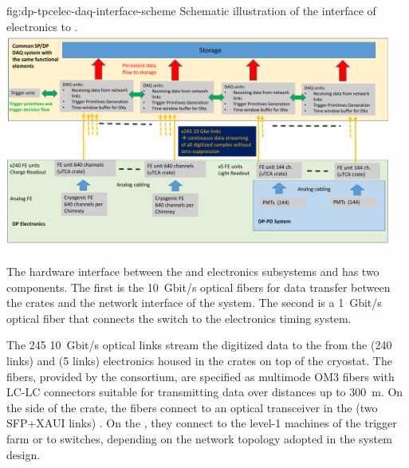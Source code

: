 \begin{dunefigure}{fig:dp-tpcelec-daq-interface-scheme}
{Schematic illustration of the interface of   electronics to .}
\includegraphics[width=0.95\textwidth]{graphics/dp-tpcelec-daq-interface-scheme}
\end{dunefigure}

The hardware interface between the   and  electronics subsystems and  has two components. The first %
is the \SI{10}{Gbit/s} optical fibers for data transfer between the  crates and the network interface of the  system. The second %
is a \SI{1}{Gbit/s} optical fiber that connects the   switch to the  electronics timing system.   


The \num{245} \SI{10}{Gbit/s} optical links stream the digitized data to the  from the  (\num{240} links) and  (\num{5} links) electronics housed in  the  crates on top of the cryostat.  The fibers, provided by the  consortium, are specified as multimode OM3 fibers \cite{om3fibers} with LC-LC connectors suitable for transmitting data over distances up to \SI{300}{\metre}.   On the side of the  crate, the fibers connect to an optical transceiver in the  (two SFP+XAUI links) \cite{natmch}.  On the , they connect to the level-1 machines of the trigger farm or to switches, depending on the network topology adopted in the  system design.

